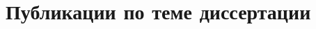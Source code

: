 \documentclass[a4paper, 14pt]{extreport}
\begin{document}
\section*{Публикации по теме диссертации}
\begin{enumerate}
  
\end{enumerate}
\thispagestyle{empty} %
\end{document}
